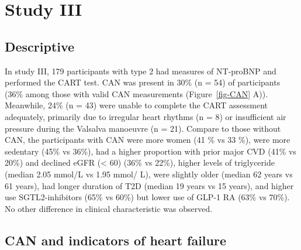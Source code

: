 \documentclass[
  a4paper,
  headsepline=true,
  open=any]{scrbook}
\begin{document}
\hypertarget{study-iii}{%
\section{Study III}\label{study-iii}}

\hypertarget{descriptive-2}{%
\subsection{Descriptive}\label{descriptive-2}}

In study III, 179 participants with type 2 had measures of NT-proBNP and
performed the CART test. CAN was present in 30\% (n = 54) of
participants (36\% among those with valid CAN measurements
(Figure~\ref{fig-CAN} A)). Meanwhile, 24\% (n = 43) were unable to
complete the CART assessment adequately, primarily due to irregular
heart rhythms (n = 8) or insufficient air pressure during the Valsalva
manoeuvre (n = 21). Compare to those without CAN, the participants with
CAN were more women (41 \% vs 33 \%), were more sedentary (45\% vs
36\%), had a higher proportion with prior major CVD (41\% vs 20\%) and
declined eGFR (\textless{} 60) (36\% vs 22\%), higher levels of
triglyceride (median 2.05 mmol/L vs 1.95 mmol/ L), were slightly older
(median 62 years vs 61 years), had longer duration of T2D (median 19
years vs 15 years), and higher use SGTL2-inhibitors (65\% vs 60\%) but
lower use of GLP-1 RA (63\% vs 70\%). No other difference in clinical
characteristic was observed.

\hypertarget{can-and-indicators-of-heart-failure}{%
\subsection{CAN and indicators of heart
failure}\label{can-and-indicators-of-heart-failure}}
\end{document}
